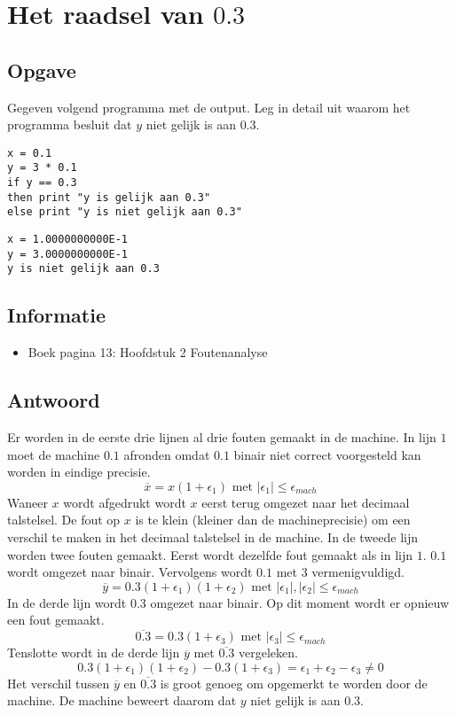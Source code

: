 \documentclass[examenvragen.tex]{subfiles}
\begin{document}
\section{Het raadsel van $0.3$}

\subsection{Opgave}
Gegeven volgend programma met de output. Leg in detail uit waarom het programma besluit dat $y$ niet gelijk is aan $0.3$.
\begin{lstlisting}
x = 0.1
y = 3 * 0.1
if y == 0.3
then print "y is gelijk aan 0.3"
else print "y is niet gelijk aan 0.3"
\end{lstlisting}
\begin{lstlisting}
x = 1.0000000000E-1
y = 3.0000000000E-1
y is niet gelijk aan 0.3
\end{lstlisting}

\subsection{Informatie}
\begin{itemize}
\item Boek pagina 13: Hoofdstuk 2 Foutenanalyse
\end{itemize}

\subsection{Antwoord}
Er worden in de eerste drie lijnen al drie fouten gemaakt in de machine.
In lijn $1$ moet de machine $0.1$ afronden omdat $0.1$ binair niet correct voorgesteld kan worden in eindige precisie.
\[
\overline{x} = x(1+\epsilon_1) \text{ met } |\epsilon_{1}| \le \epsilon_{mach}
\]
Waneer $x$ wordt afgedrukt wordt $x$ eerst terug omgezet naar het decimaal talstelsel. De fout op $x$ is te klein (kleiner dan de machineprecisie) om een verschil te maken in het decimaal talstelsel in de machine.
In de tweede lijn worden twee fouten gemaakt. Eerst wordt dezelfde fout gemaakt als in lijn $1$. $0.1$ wordt omgezet naar binair. Vervolgens wordt $0.1$ met $3$ vermenigvuldigd.
\[
\overline{y} = 0.3(1+\epsilon_1)(1+\epsilon_2) \text{ met } |\epsilon_{1}|,|\epsilon_{2}| \le \epsilon_{mach}
\]
In de derde lijn wordt $0.3$ omgezet naar binair. Op dit moment wordt er opnieuw een fout gemaakt.
\[
\overline{0.3} = 0.3(1+\epsilon_3) \text{ met }|\epsilon_{3}| \le \epsilon_{mach}
\]
Tenslotte wordt in de derde lijn $\overline{y}$ met $\overline{0.3}$ vergeleken.
\[
0.3(1+\epsilon_1)(1+\epsilon_2) - 0.3(1+\epsilon_3)
=
\epsilon_1+\epsilon_2-\epsilon_3 \neq 0
\]
Het verschil tussen $\overline{y}$ en $\overline{0.3}$ is groot genoeg om opgemerkt te worden door de machine. De machine beweert daarom dat $y$ niet gelijk is aan $0.3$.
\end{document}
